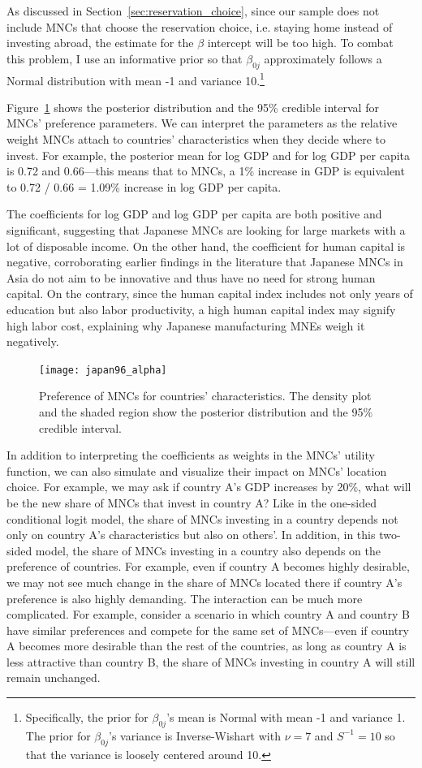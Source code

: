 As discussed in Section~\ref{sec:reservation_choice}, since our sample does not include MNCs that choose the reservation choice, i.e. staying home instead of
investing abroad, the estimate for the $\beta$ intercept will be too high. To
combat this problem, I use an informative prior so that $\beta_{0j}$
approximately follows a Normal distribution with mean -1 and variance
10.\footnote{Specifically, the prior for $\beta_{0j}$'s mean is Normal with mean
  -1 and variance 1. The prior for $\beta_{0j}$'s variance is
  Inverse-Wishart with $\nu = 7$ and $S^{-1} = 10$ so that the variance is
  loosely centered around 10.}

Figure~\ref{fig:japan96_alpha} shows the posterior distribution and the 95\%
credible interval for MNCs' preference parameters. We can interpret the
parameters as the relative weight MNCs attach to countries' characteristics when
they decide where to invest. For example, the posterior mean for log GDP and for
log GDP per capita is 0.72 and 0.66---this means that to MNCs, a 1\% increase
in GDP is equivalent to 0.72 / 0.66 = 1.09\% increase in log GDP per capita.

The coefficients for log GDP and log GDP per capita are both positive and
significant, suggesting that Japanese MNCs are looking for large markets with a
lot of disposable income. On the other hand, the coefficient for human capital
is negative, corroborating earlier findings in the literature that Japanese MNCs
in Asia do not aim to be innovative and thus have no need for strong human
capital. On the contrary, since the human capital index includes not only years of
education but also labor productivity, a high human capital index may signify
high labor cost, explaining why Japanese manufacturing MNEs weigh it negatively. 

\begin{figure}[tbp] \centering
  \texttt{[image: japan96\_alpha]}
  \caption{Preference of MNCs for countries' characteristics. The density plot
    and the shaded region show the posterior distribution and the 95\% credible
    interval.}
  \label{fig:japan96_alpha}
\end{figure}

In addition to interpreting the coefficients as weights in the MNCs' utility
function, we can also simulate and visualize their impact on MNCs' location
choice. For example, we may ask if country A's GDP increases by 20\%, what will
be the new share of MNCs that invest in country A? Like in the one-sided
conditional logit model, the share of MNCs investing in a country depends not
only on country A's characteristics but also on others'. In addition, in this
two-sided model, the share of MNCs investing in a country also depends on the
preference of countries. For example, even if country A becomes highly
desirable, we may not see much change in the share of MNCs located there if
country A's preference is also highly demanding. The interaction can be much
more complicated. For example, consider a scenario in which country A and
country B have similar preferences and compete for the same set of MNCs---even
if country A becomes more desirable than the rest of the countries, as long as
country A is less attractive than country B, the share of MNCs investing in
country A will still remain unchanged.


